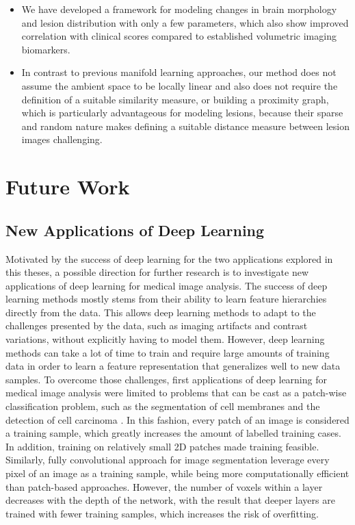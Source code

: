 \begin{itemize}
\item We have developed a framework for modeling changes in brain morphology
and lesion distribution with only a few parameters, which also show improved
correlation with clinical scores compared to established volumetric imaging
biomarkers.

\item In contrast to previous manifold learning approaches, our method does not
assume the ambient space to be locally linear and also does not require the
definition of a suitable similarity measure, or building a proximity graph,
which is particularly advantageous for modeling lesions, because their sparse
and random nature makes defining a suitable distance measure between lesion
images challenging.
\end{itemize}

\section[Future work]{Future Work}

\subsection[New applications of deep learning]{New Applications of Deep
Learning}

Motivated by the success of deep learning for the two applications explored in
this theses, a possible direction for further research is to investigate new
applications of deep learning for medical image analysis. The success of deep
learning methods mostly stems from their ability to learn feature hierarchies
directly from the data. This allows deep learning methods to adapt to the
challenges presented by the data, such as imaging artifacts and contrast
variations, without explicitly having to model them. However, deep learning
methods can take a lot of time to train and require large amounts of training
data in order to learn a feature representation that generalizes well to new
data samples. To overcome those challenges, first applications of deep learning
for medical image analysis were limited to problems that can be cast as a
patch-wise classification problem, such as the segmentation of cell membranes
\citep{ciresan2012} and the detection of cell carcinoma \citep{cruz2013}. In
this fashion, every patch of an image is considered a training sample, which
greatly increases the amount of labelled training cases.
In addition, training on relatively small 2D patches made training feasible.
Similarly, fully convolutional approach for image segmentation leverage every
pixel of an image as a training sample, while being more computationally
efficient than patch-based approaches. However, the number of voxels within a
layer decreases with the depth of the network, with the result that deeper
layers are trained with fewer training samples, which increases the risk of
overfitting.

